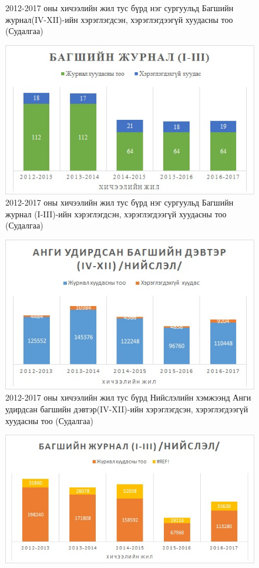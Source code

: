 \begin{figure}[htbp]
\caption[Хэрэглэгчийн судалгаа]{2012-2017 оны хичээлийн жил тус бүрд нэг сургуульд Багшийн журнал(IV-XII)-ийн хэрэглэгдсэн, хэрэглэгдээгүй хуудасны тоо (Судалгаа)}
\label{fig:Chart2}
\end{figure}\begin{figure}[htbp]
\centering
\includegraphics[scale=1]{Chart/Chart6}
\caption[Хэрэглэгчийн судалгаа]{2012-2017 оны хичээлийн жил тус бүрд нэг сургуульд Багшийн журнал (I-III)-ийн хэрэглэгдсэн, хэрэглэгдээгүй хуудасны тоо (Судалгаа)}
\label{fig:Chart2}
\end{figure}\begin{figure}[htbp]
\centering
\includegraphics[scale=0.9]{Chart/Chart7}
\caption[Хэрэглэгчийн судалгаа]{2012-2017 оны хичээлийн жил тус бүрд Нийслэлийн хэмжээнд Анги удирдсан багшийн дэвтэр(IV-XII)-ийн хэрэглэгдсэн, хэрэглэгдээгүй хуудасны тоо (Судалгаа)}
\label{fig:Chart2}
\end{figure}\begin{figure}[htbp]
\centering
\includegraphics[scale=0.9]{Chart/Chart8}

\end{figure}

